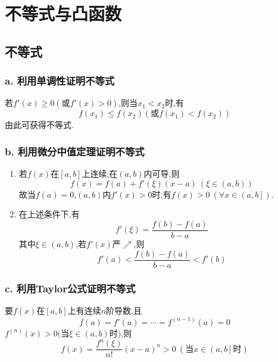 \chapter{不等式与凸函数}

\section{不等式}

\subsection*{a. 利用单调性证明不等式}

若$f'\left( x \right) \ge 0\left( \text{或}f'\left( x \right) >0 \right) $,则当$x_1<x_2$时,有$$f\left( x_1 \right) \le f\left( x_2 \right) \left( \text{或} f\left( x_1 \right) <f\left( x_2 \right) \right)$$由此可获得不等式.

\subsection*{b. 利用微分中值定理证明不等式}

\begin{enumerate}
	\item 若$f\left( x \right) $在$\left[ a,b \right] $上连续,在$\left( a,b \right) $内可导,则
	      $$
		      f\left( x \right) =f\left( a \right) +f'\left( \xi \right) \left( x-a \right) \ \left( \xi \in \left( a,b \right) \right)
	      $$
	      故当$f\left( a \right) =0$,$\left( a,b \right) $内$f'\left( x \right) >0$时,有$f\left( x \right) >0\ \left( \forall x\in \left( \left. a,b \right] \right. \right) $.
	\item 在上述条件下,有
	      $$
		      f'\left( \xi \right) =\frac{f\left( b \right) -f\left( a \right)}{b-a}
	      $$
	      其中$\xi \in \left( a,b \right) $,若$f'\left( x \right) $严$\nearrow $,则
	      $$
		      f'\left( a \right) <\frac{f\left( b \right) -f\left( a \right)}{b-a}<f'\left( b \right)
	      $$
\end{enumerate}

\subsection*{c. 利用Taylor公式证明不等式}

要$f\left( x \right) $在$\left[ a,b \right] $上有连续$n$阶导数,且$$f\left( a \right) =f'\left( a \right) =\cdots =f^{\left( n-1 \right)}\left( a \right) =0$$$f^{\left( n \right)}\left( x \right) >0$$($当$\xi \in \left( a,b \right) $时$)$,则
			$$
				f\left( x \right) =\frac{f^n\left( \xi \right)}{n!}\left( x-a \right) ^n>0\ \left( \text{当}x\in \left( \left. a,b \right] \right. \text{时} \right)
			$$

